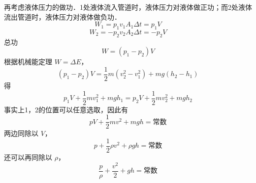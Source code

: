 再考虑液体压力的做功．1处液体流入管道时，液体压力对液体做正功；而2处液体流出管道时，液体压力对液体做负功．
\begin{equation}
W_1=p_1v_1A_1\Delta t=p_1V 
\end{equation}
\begin{equation}
W_2=-p_2v_2A_2 \Delta t=-p_2V 
\end{equation}
总功
\begin{equation}
W=(p_1-p_2)V
\end{equation}
根据机械能定理 $W=\Delta E$，
\begin{equation}
(p_1-p_2)V= \frac{1}{2}m(v_2^2-v_1^2)+mg(h_2-h_1)
\end{equation}
得
\begin{equation}
p_1V+\frac{1}{2}mv_1^2+mgh_1=p_2V+\frac{1}{2}mv_2^2+mgh_2
\end{equation}
事实上1，2的位置可以任意选取，因此有
\begin{equation}
pV+\frac{1}{2}mv^2+mgh=\text{常数}
\end{equation}
两边同除以 $V$，
\begin{equation}
p+\frac{1}{2}\rho v^2+\rho gh=\text{常数}
\end{equation}
还可以再同除以 $\rho$，
\begin{equation}
\frac{p}{\rho} + \frac{v^2}{2} + gh = \text{常数}
\end{equation}



